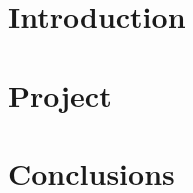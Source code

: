 \documentclass[titlepage,openright,twoside,a4paper,
final,12pt,english]{book}
\author{Álvaro González Jiménez}{Grado en Ingeniería Informática - Ingeniería del Software}{D.~}{53585603L}
\begin{document}
\makeTitlePage

\pagestyle{trinidadPhD}

\tableofcontents



\listoffigures
\listoftables


\lineNumbersOn
\part{Introduction}

\part{Project}

\part{Conclusions}


\appendix


\lineNumbersOff

\printglossaries
\newpage
\end{document}
